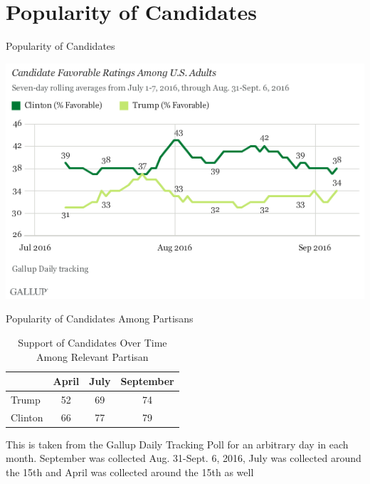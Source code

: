 \documentclass{beamer}
\begin{document}
\section{Popularity of Candidates}
\begin{frame}{Popularity of Candidates}
\begin{center}
\includegraphics[width=.9\textwidth]{popularity}
\end{center}
\end{frame}
\begin{frame}{Popularity of Candidates Among Partisans}
\begin{table}
\centering
\begin{threeparttable}
\caption*{Support of Candidates Over Time Among Relevant Partisan}
\begin{tabular}{lccc}\toprule
	&	April	&	July	&	September	\\	\midrule
Trump	&	52	&	69	&	74	\\		
Clinton	&	66	&	77	&	79	\\	\bottomrule
\end{tabular}
\begin{tablenotes}
\tiny
\item This is taken from the Gallup Daily Tracking Poll for an arbitrary day in each month. September was collected Aug. 31-Sept. 6, 2016, July was collected around the 15th and April was collected around the 15th as well
\end{tablenotes}
\end{threeparttable}
\end{table}

\end{frame}
\end{document}
